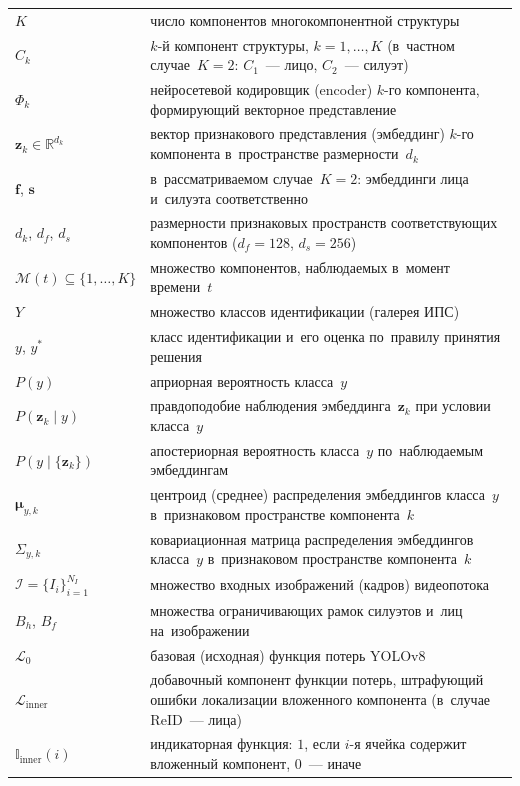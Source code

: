 \begin{longtable}{@{}p{}p{}@{}}
$K$ & число компонентов многокомпонентной структуры\\
$C_k$ & $k$-й компонент структуры, $k=1,\ldots,K$ (в~частном случае~$K=2$: $C_1$~--- лицо, $C_2$~--- силуэт)\\
$\Phi_k$ & нейросетевой кодировщик (encoder) $k$-го компонента, формирующий векторное представление\\
$\mathbf{z}_k\in\mathbb{R}^{d_k}$ & вектор признакового представления (эмбеддинг) $k$-го компонента в~пространстве размерности~$d_k$\\
$\mathbf{f}$, $\mathbf{s}$ & в~рассматриваемом случае~$K=2$: эмбеддинги лица и~силуэта соответственно\\
$d_k$, $d_f$, $d_s$ & размерности признаковых пространств соответствующих компонентов ($d_f=128$, $d_s=256$)\\
$\mathcal{M}(t)\subseteq\{1,\ldots,K\}$ & множество компонентов, наблюдаемых в~момент времени~$t$\\
$Y$ & множество классов идентификации (галерея ИПС)\\
$y$, $y^{*}$ & класс идентификации и~его оценка по~правилу принятия решения\\
$P(y)$ & априорная вероятность класса~$y$\\
$P(\mathbf{z}_k\mid y)$ & правдоподобие наблюдения эмбеддинга~$\mathbf{z}_k$ при условии класса~$y$\\
$P(y\mid\{\mathbf{z}_k\})$ & апостериорная вероятность класса~$y$ по~наблюдаемым эмбеддингам\\
$\boldsymbol{\mu}_{y,k}$ & центроид (среднее) распределения эмбеддингов класса~$y$ в~признаковом пространстве компонента~$k$\\
$\Sigma_{y,k}$ & ковариационная матрица распределения эмбеддингов класса~$y$ в~признаковом пространстве компонента~$k$\\
$\mathcal{I}=\{I_i\}_{i=1}^{N_I}$ & множество входных изображений (кадров) видеопотока\\
$B_h$, $B_f$ & множества ограничивающих рамок силуэтов и~лиц на~изображении\\
$\mathcal{L}_0$ & базовая (исходная) функция потерь YOLOv8\\
$\mathcal{L}_{\text{inner}}$ & добавочный компонент функции потерь, штрафующий ошибки локализации вложенного компонента (в~случае ReID~--- лица)\\
$\mathbb{I}_{\text{inner}}(i)$ & индикаторная функция: $1$, если $i$-я ячейка содержит вложенный компонент, $0$~--- иначе\\

\end{longtable}
